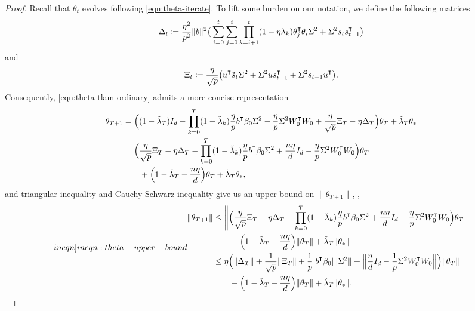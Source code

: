 \begin{proof}
Recall that $\theta_t$ evolves following \cref{eqn:theta-iterate}.
To lift some burden on our notation, we define the following matrices
\begin{align*}
    \Delta_t \defeq \frac{\eta^2}{p^2} \|b\|^2\big(\sum_{i=0}^t\sum_{j=0}^i \prod_{k=i+1}^t(1-\eta\lambda_k)\theta_j\transpose \theta_i \Sigma^2 + \Sigma^2 s_t s_{t-1}\transpose \big)
\end{align*}
and
\begin{align*}
    \Xi_t \defeq \frac{\eta}{\sqrt p}\big(u\transpose \tilde{s}_t \Sigma^2 + \Sigma^2 u s_{t-1}\transpose + \Sigma^2 s_{t-1}u\transpose\big).
\end{align*}
Consequently, \cref{eqn:theta-tlam-ordinary} admits a more concise representation
\begin{align*}
    \begin{split}
        \theta_{T+1} & = \Big((1-\tlam_T)I_d -\prod_{k=0}^T(1-\tlam_k)\frac{\eta}{p}b\transpose\beta_0 \Sigma^2 - \frac{\eta}{p}\Sigma^2 W_0\transpose W_0 + \frac{\eta}{\sqrt p}\Xi_T - \eta\Delta_T \Big)\theta_T + \tlam_T \theta_\ast \\
        & = \Big( \frac{\eta}{\sqrt p}\Xi_T - \eta\Delta_T - \prod_{k=0}^T (1-\tlam_k) \frac{\eta}{p} b\transpose\beta_0 \Sigma^2 + \frac{n\eta}{d}I_d - \frac{\eta}{p}\Sigma^2 W_0\transpose W_0 \Big)\theta_T \\
        & \qquad + \Big( 1-\tlam_T - \frac{n\eta}{d} \Big)\theta_T + \tlam_T \theta_\ast,
    \end{split}
\end{align*}
and triangular inequality and Cauchy-Schwarz inequality give us an upper bound on $\|\theta_{T+1}\|$, \ie,
\begin{align}\label[ineqn]{ineqn:theta-upper-bound}
    \begin{split}
        \|\theta_{T+1}\| & \leq \left\| \Big( \frac{\eta}{\sqrt p}\Xi_T - \eta\Delta_T - \prod_{k=0}^T(1-\tlam_k)\frac{\eta}{p}b\transpose\beta_0 \Sigma^2 + \frac{n\eta}{d}I_d - \frac{\eta}{p}\Sigma^2 W_0\transpose W_0 \Big)\theta_T \right\| \\
        & \qquad + \Big( 1-\tlam_T - \frac{n\eta}{d} \Big)\|\theta_T\| + \tlam_T \|\theta_\ast\| \\
        & \leq \eta \Big( \|\Delta_T\| + \frac{1}{\sqrt p}\|\Xi_T\| + \frac{1}{p}|b\transpose\beta_0| \|\Sigma^2\| + \Big\| \frac{n}{d}I_d - \frac{1}{p}\Sigma^2 W_0\transpose W_0 \Big\| \Big) \|\theta_T\| \\
        & \qquad + \Big( 1-\tlam_T - \frac{n\eta}{d} \Big)\|\theta_T\| + \tlam_T \|\theta_\ast\|.

\end{split}
\end{align}
\end{proof}
